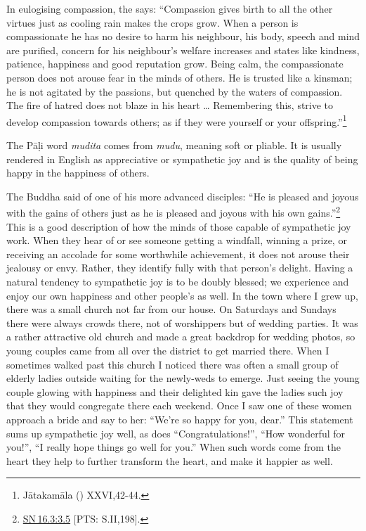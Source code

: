 \documentclass[10pt, openright]{book}
\begin{document}
In eulogising compassion, the \cite{Jātakamāla} says: “Compassion gives birth to all the other virtues just as cooling rain makes the crops grow. When a person is compassionate he has no desire to harm his neighbour, his body, speech and mind are purified, concern for his neighbour’s welfare increases and states like kindness, patience, happiness and good reputation grow. Being calm, the compassionate person does not arouse fear in the minds of others. He is trusted like a kinsman; he is not agitated by the passions, but quenched by the waters of compassion. The fire of hatred does not blaze in his heart … Remembering this, strive to develop compassion towards others; as if they were yourself or your offspring.”\footnote {Jātakamāla (\cite{Speyer 1895a}) XXVI,42-44.}


The Pāḷi word \textit{mudita} comes from \textit{mudu}, meaning soft or pliable. It is usually rendered in English as appreciative or sympathetic joy and is the quality of being happy in the happiness of others.


The Buddha said of one of his more advanced disciples: “He is pleased and joyous with the gains of others just as he is pleased and joyous with his own gains.”\footnote {\href{https://suttacentral.net/sn16.3/en/sujato\#3.5}{SN 16.3:3.5} [PTS: S.II,198].} This is a good description of how the minds of those capable of sympathetic joy work. When they hear of or see someone getting a windfall, winning a prize, or receiving an accolade for some worthwhile achievement, it does not arouse their jealousy or envy. Rather, they identify fully with that person’s delight. Having a natural tendency to sympathetic joy is to be doubly blessed; we experience and enjoy our own happiness and other people’s as well. In the town where I grew up, there was a small church not far from our house. On Saturdays and Sundays there were always crowds there, not of worshippers but of wedding parties. It was a rather attractive old church and made a great backdrop for wedding photos, so young couples came from all over the district to get married there. When I sometimes walked past this church I noticed there was often a small group of elderly ladies outside waiting for the newly-weds to emerge. Just seeing the young couple glowing with happiness and their delighted kin gave the ladies such joy that they would congregate there each weekend. Once I saw one of these women approach a bride and say to her: “We’re so happy for you, dear.” This statement sums up sympathetic joy well, as does “Congratulations!”, “How wonderful for you!”, “I really hope things go well for you.” When such words come from the heart they help to further transform the heart, and make it happier as well.
\end{document}
